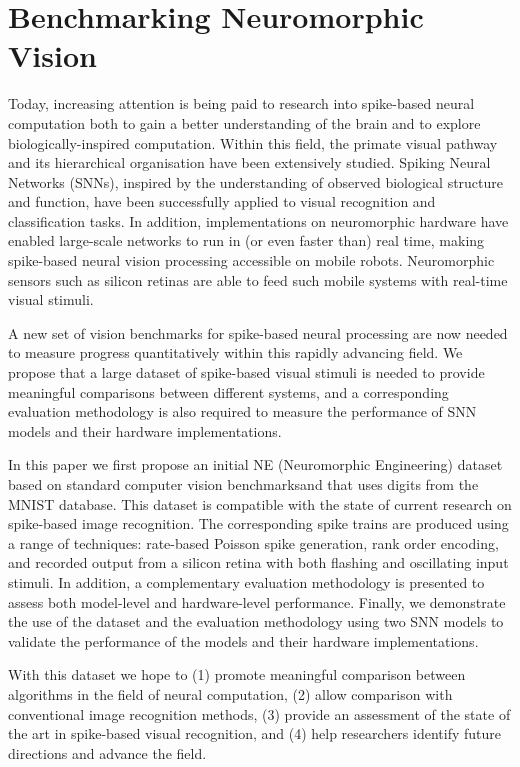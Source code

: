 \chapter{Benchmarking Neuromorphic Vision}
\label{cha:bench}

Today, increasing attention is being paid to research into spike-based neural computation both to gain a better understanding of the brain and to explore biologically-inspired computation.
Within this field, the primate visual pathway and its hierarchical organisation have been extensively studied.
Spiking Neural Networks (SNNs), inspired by the understanding of observed biological structure and function, have been successfully applied to visual recognition and classification tasks.
In addition, implementations on neuromorphic hardware have enabled large-scale networks to run in (or even faster than) real time, making spike-based neural vision processing accessible on mobile robots.
Neuromorphic sensors such as silicon retinas are able to feed such mobile systems with real-time visual stimuli.

A new set of vision benchmarks for spike-based neural processing are now needed to measure progress quantitatively within this rapidly advancing field.
We propose that a large dataset of spike-based visual stimuli is needed to provide meaningful comparisons between different systems, and a corresponding evaluation methodology is also required to measure the performance of SNN models and their hardware implementations.

In this paper we first propose an initial NE (Neuromorphic Engineering) dataset based on standard computer vision benchmarksand that uses digits from the MNIST database.
This dataset is compatible with the state of current research on spike-based image recognition.
The corresponding spike trains are produced using a range of techniques: rate-based Poisson spike generation, rank order encoding, and recorded output from a silicon retina with both flashing and oscillating input stimuli.
In addition, a complementary evaluation methodology is presented to assess both model-level and hardware-level performance.
Finally, we demonstrate the use of the dataset and the evaluation methodology using two SNN models to validate the performance of the models and their hardware implementations.

With this dataset we hope to (1) promote meaningful comparison between algorithms in the field of neural computation, (2) allow comparison with conventional image recognition methods, (3) provide an assessment of the state of the art in spike-based visual recognition, and (4) help researchers identify future directions and advance the field.

